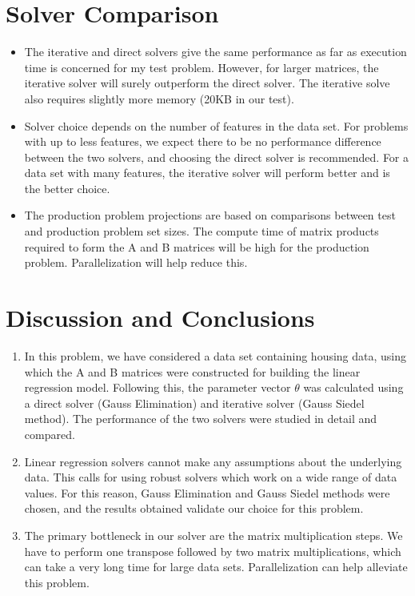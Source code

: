 \documentclass{article}
\begin{document}
\begin{spacing}{1.1}
\section{Solver Comparison}

\begin{itemize}
    \item The iterative and direct solvers give the same performance as far as execution time is concerned for my test problem. However, for larger matrices, the iterative solver will surely outperform the direct solver. The iterative solve also requires slightly more memory (20KB in our test).  
    \item Solver choice depends on the number of features in the data set. For problems with up to less features, we expect there to be no performance difference between the two solvers, and choosing the direct solver is recommended. For a data set with many features, the iterative solver will perform better and is the better choice.
    \item The production problem projections are based on comparisons between test and production problem set sizes. The compute time of matrix products required to form the A and B matrices will be high for the production problem. Parallelization will help reduce this.
    
\end{itemize}

\section{Discussion and Conclusions}

\begin{enumerate}
    \item In this problem, we have considered a data set containing housing data, using which the A and B matrices were constructed for building the linear regression model. Following this, the parameter vector $\theta$ was calculated using a direct solver (Gauss Elimination) and iterative solver (Gauss Siedel method). The performance of the two solvers were studied in detail and compared.
    \item Linear regression solvers cannot make any assumptions about the underlying data. This calls for using robust solvers which work on a wide range of data values. For this reason, Gauss Elimination and Gauss Siedel methods were chosen, and the results obtained validate our choice for this problem.
    \item The primary bottleneck in our solver are the matrix multiplication steps. We have to perform one transpose followed by two matrix multiplications, which can take a very long time for large data sets. Parallelization can help alleviate this problem.
\end{enumerate}







\end{spacing}
\end{document}
